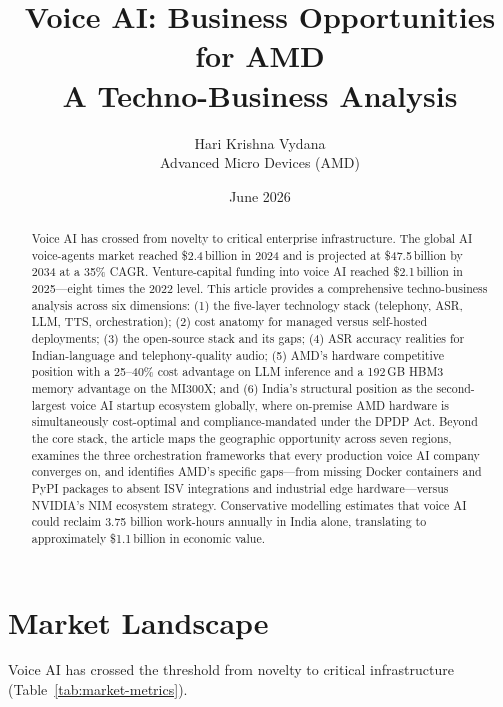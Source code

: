 \documentclass[12pt,a4paper]{article}
\title{%
  \LARGE\bfseries Voice AI: Business Opportunities for AMD\\[6pt]
  \large A Techno-Business Analysis%
}
\author{Hari Krishna Vydana \\ \small Advanced Micro Devices (AMD)}
\date{June 2026}
\begin{document}
\maketitle\thispagestyle{empty}

\begin{abstract}
\noindent
Voice AI has crossed from novelty to critical enterprise infrastructure.
The global AI voice-agents market reached \$2.4\,billion in 2024 and is
projected at \$47.5\,billion by 2034 at a 35\% CAGR.  Venture-capital
funding into voice AI reached \$2.1\,billion in 2025---eight times the
2022 level.  This article provides a comprehensive techno-business analysis
across six dimensions: (1) the five-layer technology stack (telephony,
ASR, LLM, TTS, orchestration); (2) cost anatomy for managed versus
self-hosted deployments; (3) the open-source stack and its gaps; (4) ASR
accuracy realities for Indian-language and telephony-quality audio;
(5) AMD's hardware competitive position with a 25--40\% cost advantage on
LLM inference and a 192\,GB HBM3 memory advantage on the MI300X; and
(6) India's structural position as the second-largest voice AI startup
ecosystem globally, where on-premise AMD hardware is simultaneously
cost-optimal and compliance-mandated under the DPDP Act.  Beyond the core
stack, the article maps the geographic opportunity across seven regions,
examines the three orchestration frameworks that every production voice AI
company converges on, and identifies AMD's specific gaps---from missing
Docker containers and PyPI packages to absent ISV integrations and
industrial edge hardware---versus NVIDIA's NIM ecosystem strategy.
Conservative modelling estimates that voice AI could reclaim 3.75 billion
work-hours annually in India alone, translating to approximately
\$1.1\,billion in economic value.
\end{abstract}

\tableofcontents
\newpage

\section{Market Landscape}
\label{sec:market}

Voice AI has crossed the threshold from novelty to critical infrastructure
(Table~\ref{tab:market-metrics}).
\end{document}
